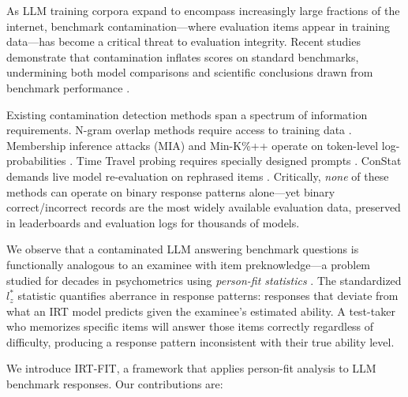 \documentclass[11pt,a4paper]{article}
\begin{document}
As LLM training corpora expand to encompass increasingly large fractions of the internet, benchmark contamination---where evaluation items appear in training data---has become a critical threat to evaluation integrity. Recent studies demonstrate that contamination inflates scores on standard benchmarks, undermining both model comparisons and scientific conclusions drawn from benchmark performance \citep{magar2022data,sainz2023nlp,jacovi2023stop}.

Existing contamination detection methods span a spectrum of information requirements. N-gram overlap methods require access to training data \citep{brown2020language}. Membership inference attacks (MIA) and Min-K\%++ operate on token-level log-probabilities \citep{shi2024detecting}. Time Travel probing requires specially designed prompts \citep{dong2024generalization}. ConStat demands live model re-evaluation on rephrased items \citep{li2024constat}. Critically, \emph{none} of these methods can operate on binary response patterns alone---yet binary correct/incorrect records are the most widely available evaluation data, preserved in leaderboards and evaluation logs for thousands of models.

We observe that a contaminated LLM answering benchmark questions is functionally analogous to an examinee with item preknowledge---a problem studied for decades in psychometrics using \emph{person-fit statistics} \citep{meijer2001review}. The standardized $l_z^*$ statistic \citep{snijders2001item} quantifies aberrance in response patterns: responses that deviate from what an IRT model predicts given the examinee's estimated ability. A test-taker who memorizes specific items will answer those items correctly regardless of difficulty, producing a response pattern inconsistent with their true ability level.

We introduce IRT-FIT, a framework that applies person-fit analysis to LLM benchmark responses. Our contributions are:
\end{document}
